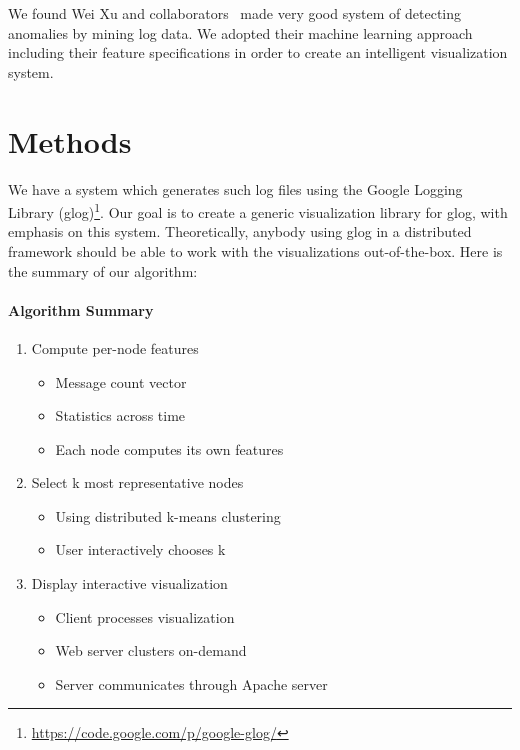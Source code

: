 \documentclass[conference]{style/acmsiggraph}
\begin{document}
We found Wei Xu and collaborators~\cite{Xu09} made very good system of detecting anomalies by mining
log data. We adopted their machine learning approach including their feature specifications in order
to create an intelligent visualization system.

\section{Methods}

We have a system which generates such log files using the Google Logging Library
(glog)\footnote{\url{https://code.google.com/p/google-glog/}}. Our goal is to create a generic
visualization library for glog, with emphasis on this system. Theoretically, anybody using glog in a
distributed framework should be able to work with the visualizations out-of-the-box. Here is the
summary of our algorithm:

\paragraph{Algorithm Summary}
\begin{enumerate}
    \item Compute per-node features
        \begin{itemize}
            \item Message count vector
            \item Statistics across time
            \item Each node computes its own features
        \end{itemize}
    \item Select k most representative nodes
        \begin{itemize}
            \item Using distributed k-means clustering
            \item User interactively chooses k
        \end{itemize}
    \item Display interactive visualization
        \begin{itemize}
            \item Client processes visualization
            \item Web server clusters on-demand
            \item Server communicates through Apache server
        \end{itemize}
\end{enumerate}
\end{document}
